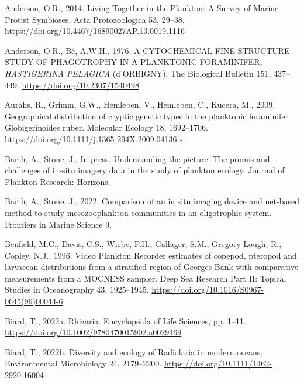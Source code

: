 \documentclass[
]{article}
\newlength{\cslhangindent}
\newlength{\cslentryspacingunit} %
\newenvironment{CSLReferences}[2] %
 {%
  \setlength{\parindent}{0pt}
  \ifodd #1
  \let\oldpar\par
  \def\par{\hangindent=\cslhangindent\oldpar}
  \fi
  \setlength{\parskip}{#2\cslentryspacingunit}
 }%
 {}
\begin{document}
\hypertarget{refs}{}
\begin{CSLReferences}{1}{0}
\leavevmode{}%
Anderson, O.R., 2014. Living Together in the Plankton: A Survey of
Marine Protist Symbioses. Acta Protozoologica 53, 29--38.
\url{https://doi.org/10.4467/16890027AP.13.0019.1116}

\leavevmode{}%
Anderson, O.R., Bé, A.W.H., 1976. A CYTOCHEMICAL FINE STRUCTURE STUDY OF
PHAGOTROPHY IN A PLANKTONIC FORAMINIFER, {\emph{HASTIGERINA PELAGICA}}
(d'ORBIGNY). The Biological Bulletin 151, 437--449.
\url{https://doi.org/10.2307/1540498}

\leavevmode{}%
Aurahs, R., Grimm, G.W., Hemleben, V., Hemleben, C., Kucera, M., 2009.
Geographical distribution of cryptic genetic types in the planktonic
foraminifer Globigerinoides ruber. Molecular Ecology 18, 1692--1706.
\url{https://doi.org/10.1111/j.1365-294X.2009.04136.x}

\leavevmode{}%
Barth, A., Stone, J., In press. Understanding the picture: The promis
and challenges of in-situ imagery data in the study of plankton ecology.
Journal of Plankton Research: Horizons.

\leavevmode{}%
Barth, A., Stone, J., 2022.
\href{https://www.frontiersin.org/articles/10.3389/fmars.2022.898057}{Comparison
of an in situ imaging device and net-based method to study
mesozooplankton communities in an oligotrophic system}. Frontiers in
Marine Science 9.

\leavevmode{}%
Benfield, M.C., Davis, C.S., Wiebe, P.H., Gallager, S.M., Gregory Lough,
R., Copley, N.J., 1996. Video Plankton Recorder estimates of copepod,
pteropod and larvacean distributions from a stratified region of Georges
Bank with comparative measurements from a MOCNESS sampler. Deep Sea
Research Part II: Topical Studies in Oceanography 43, 1925--1945.
\url{https://doi.org/10.1016/S0967-0645(96)00044-6}

\leavevmode{}%
Biard, T., 2022a. Rhizaria. Encyclopeida of Life Sciences, pp. 1--11.
\url{https://doi.org/10.1002/9780470015902.a0029469}

\leavevmode{}%
Biard, T., 2022b. Diversity and ecology of Radiolaria in modern oceans.
Environmental Microbiology 24, 2179--2200.
\url{https://doi.org/10.1111/1462-2920.16004}


\end{CSLReferences}
\end{document}
